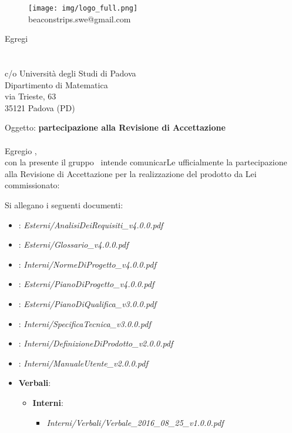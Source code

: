 \documentclass[a4paper]{article}
\newcommand{\spazio}{\vspace{1.5cm}}
\begin{document}
\spazio
\begin{figure}[!h]
	\centering
	\texttt{[image: img/logo\_full.png]} \\
	beaconstrips.swe@gmail.com
\end{figure}

\spazio

\begin{flushright}
\date{2016-08-17}
Egregi \\
\COMMITTENTE \\
\CARDIN \\
c/o Università degli Studi di Padova  \\
Dipartimento di Matematica \\
via Trieste, 63 \\
35121 Padova (PD)
\end{flushright}
\spazio

Oggetto: \textbf{partecipazione alla Revisione di Accettazione} \\ \\
Egregio \COMMITTENTE,\\
con la presente il gruppo \AUTORE \ intende comunicarLe ufficialmente la partecipazione alla Revisione di Accettazione per la realizzazione del prodotto da Lei commissionato: \\

Si allegano i seguenti documenti:
\begin{itemize}
	\item \textbf{\ARdocRQ}: \textit{Esterni/AnalisiDeiRequisiti\_v4.0.0.pdf}
	\item \textbf{\GldocRQ}: \textit{Esterni/Glossario\_v4.0.0.pdf}
	\item \textbf{\NPdocRQ}: \textit{Interni/NormeDiProgetto\_v4.0.0.pdf}
	\item \textbf{\PPdocRQ}: \textit{Esterni/PianoDiProgetto\_v4.0.0.pdf}
	\item \textbf{\PQdocRQ}: \textit{Esterni/PianoDiQualifica\_v3.0.0.pdf}
	\item \textbf{\SFdocRQ}: \textit{Interni/SpecificaTecnica\_v3.0.0.pdf}
	\item \textbf{\DPdocRQ}: \textit{Interni/DefinizioneDiProdotto\_v2.0.0.pdf}
	\item \textbf{\MUdocRQ}: \textit{Interni/ManualeUtente\_v2.0.0.pdf}
	\item \textbf{Verbali}:
		\begin{itemize}
			\item \textbf{Interni}:
				\begin{itemize}
					\item \textit{Interni/Verbali/Verbale\_2016\_08\_25\_v1.0.0.pdf}
				\end{itemize}
		\end{itemize}
	\end{itemize}
\spazio
\end{document}
